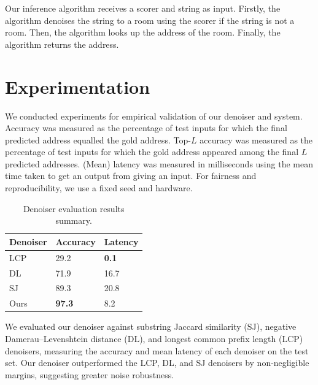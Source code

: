 \documentclass{article}
\theoremstyle{definition}
\begin{document}
Our inference algorithm receives a scorer and string as input.
Firstly, the algorithm denoises the string to a room using the scorer if the string is not a room.
Then, the algorithm looks up the address of the room.
Finally, the algorithm returns the address.

\newpage

\section{Experimentation}

We conducted experiments for empirical validation of our denoiser and system.
Accuracy was measured as the percentage of test inputs for which the final predicted address equalled the gold address.
Top-$L$ accuracy was measured as the percentage of test inputs for which the gold address appeared among the final $L$ predicted addresses.
(Mean) latency was measured in milliseconds using the mean time taken to get an output from giving an input.
For fairness and reproducibility, we use a fixed seed and hardware.

\begin{table}[H]
	\centering
	\begin{tabular}{lll}
		\toprule
		\textbf{Denoiser} & \textbf{Accuracy} & \textbf{Latency} \\
		\midrule
		LCP & 29.2 & \textbf{0.1} \\
		DL & 71.9 & 16.7 \\
		SJ & 89.3 & 20.8 \\
		Ours & \textbf{97.3} & 8.2 \\
		\bottomrule
	\end{tabular}
	\caption{Denoiser evaluation results summary.}
\end{table}

We evaluated our denoiser against
substring Jaccard similarity (SJ),
negative Damerau--Levenshtein distance (DL),
and
longest common prefix length (LCP)
denoisers,
measuring the accuracy and mean latency of each denoiser on the test set.
Our denoiser outperformed the LCP, DL, and SJ denoisers by non-negligible margins,
suggesting greater noise robustness.
\end{document}
